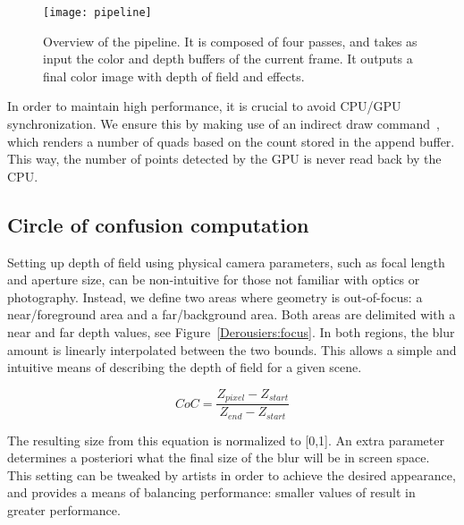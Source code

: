 	\begin{figure}[htb]\centering
	\texttt{[image: pipeline]}
	\caption{Overview of the pipeline. It is composed of four passes, and takes as input the color and depth buffers of the current frame. It outputs a final color image with depth of field and \bokeh effects.}
	\label{Derousiers:pipeline}
	\end{figure}

In order to maintain high performance, it is crucial to avoid CPU/GPU synchronization. We ensure this by making use of an indirect draw command~\cite{IndirectDraw09}, which renders a number of quads based on the count stored in the append buffer. This way, the number of \bokeh points detected by the GPU is never read back by the CPU.

\subsection{Circle of confusion computation}
Setting up depth of field using physical camera parameters, such as focal length and aperture size, can be non-intuitive for those not familiar with optics or photography. Instead, we define two areas where geometry is out-of-focus: a near/foreground area and a far/background area. Both areas are delimited with a near and far depth values, see Figure~\ref{Derousiers:focus}. In both regions, the blur amount is linearly interpolated between the two bounds. This allows a simple and intuitive means of describing the depth of field for a given scene.

$$
	CoC = \frac{Z_{pixel} - Z_{start} }{ Z_{end} - Z_{start} }
$$

The resulting \coc size from this equation is normalized to [0,1]. An extra parameter  determines a posteriori what the final size of the blur will be in screen space. This setting can be tweaked by artists in order to achieve the desired appearance, and provides a means of balancing performance: smaller values of  result in greater performance.


